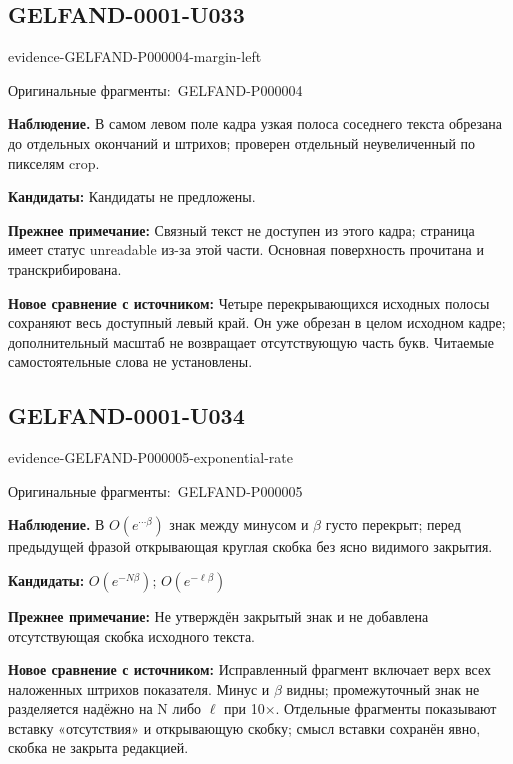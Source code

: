 \documentclass[11pt]{article}
\newcommand{\EvidenceBlock}[4]{%
 \par\smallskip\noindent\begin{minipage}{\linewidth}
 \begin{minipage}[t]{.47\linewidth}\vspace{0pt}\centering
 \csname evidence-#1-#2\endcsname\par
 {\scriptsize\SourceCropCaption\ #1}\par
 \end{minipage}\hfill
 \begin{minipage}[t]{.49\linewidth}\vspace{0pt}\raggedright
 {\small\color{orange!65!black}\textbf{#4} #3}\par
 \end{minipage}
 \end{minipage}\par\smallskip}
\newcommand{\SourceCropCaption}{Оригинальные фрагменты:}\newcommand{\ReadingCaption}{Сомнительное чтение.}\newcommand{\IncompleteCaption}{Неразобранный фрагмент.}\newcommand{\DiagramCaption}{Рисунок и набранное описание.}
\begin{document}
\subsection*{GELFAND-0001-U033}
\EvidenceBlock{GELFAND-P000004}{margin-left}{В самом левом поле кадра узкая полоса соседнего текста обрезана до отдельных окончаний и штрихов; проверен отдельный неувеличенный по пикселям crop.}{Наблюдение.}
\par\smallskip\noindent\textbf{Кандидаты: } Кандидаты не предложены.\par
\par\smallskip\noindent\textbf{Прежнее примечание: } Связный текст не доступен из этого кадра; страница имеет статус unreadable из-за этой части. Основная поверхность прочитана и транскрибирована.\par
\par\smallskip\noindent\textbf{Новое сравнение с источником: } Четыре перекрывающихся исходных полосы сохраняют весь доступный левый край. Он уже обрезан в целом исходном кадре; дополнительный масштаб не возвращает отсутствующую часть букв. Читаемые самостоятельные слова не установлены.\par

\subsection*{GELFAND-0001-U034}
\EvidenceBlock{GELFAND-P000005}{exponential-rate}{В \(O(e^{\cdots\beta})\) знак между минусом и \(\beta\) густо перекрыт; перед предыдущей фразой открывающая круглая скобка без ясно видимого закрытия.}{Наблюдение.}
\par\smallskip\noindent\textbf{Кандидаты: } \(O(e^{-N\beta})\); \(O(e^{-\ell\beta})\)\par
\par\smallskip\noindent\textbf{Прежнее примечание: } Не утверждён закрытый знак и не добавлена отсутствующая скобка исходного текста.\par
\par\smallskip\noindent\textbf{Новое сравнение с источником: } Исправленный фрагмент включает верх всех наложенных штрихов показателя. Минус и \(\beta\) видны; промежуточный знак не разделяется надёжно на N либо \(\ell\) при 10×. Отдельные фрагменты показывают вставку «отсутствия» и открывающую скобку; смысл вставки сохранён явно, скобка не закрыта редакцией.\par
\end{document}

